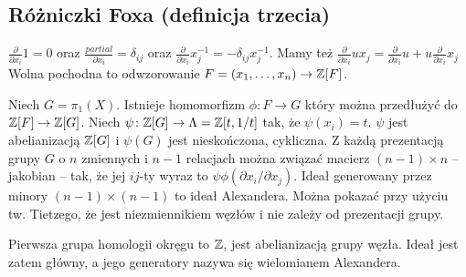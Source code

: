 
\subsection{Różniczki Foxa (definicja trzecia)}
\begin{tobedone}
$\frac {\partial}{\partial x_i} 1 = 0$ oraz $\frac{partial}{\partial x_i} = \delta_{ij}$ oraz $\frac{\partial}{\partial x_i} x_j^{-1} = - \delta_{ij} x^{-1}_j$.
Mamy też $\frac{\partial}{\partial x_i} ux_j = \frac{\partial}{\partial x_i}u + u \frac{\partial}{\partial x_i} x_j$
Wolna pochodna to odwzorowanie $F = (x_1, \ldots, x_n) \to \mathbb Z[F]$.
\end{tobedone}

\begin{tobedone}
Niech $G = \pi_1(X)$.
Istnieje homomorfizm $\phi \colon F \to G$ który można przedłużyć do $\mathbb Z[F] \to \mathbb Z[G]$.
Niech $\psi \colon \mathbb Z[G] \to \Lambda = \mathbb Z[t, 1/t]$ tak, że $\psi(x_i) = t$.
$\psi$ jest abelianizacją $\mathbb Z[G]$ i $\psi(G)$ jest nieskończona, cykliczna.
Z każdą prezentacją grupy $G$ o $n$ zmiennych i $n-1$ relacjach można związać macierz $(n-1) \times n$ -- jakobian -- tak, że jej $ij$-ty wyraz to $\psi\phi(\partial x_i / \partial x_j)$.
Ideał generowany przez minory $(n-1) \times (n-1)$ to ideał Alexandera.
Można pokazać przy użyciu tw. Tietzego, że jest niezmiennikiem węzłów i nie zależy od prezentacji grupy.
\end{tobedone}

\begin{tobedone}
Pierwsza grupa homologii okręgu to $\mathbb Z$, jest abelianizacją grupy węzła.
Ideał jest zatem główny, a jego generatory nazywa się wielomianem Alexandera.
\end{tobedone}



